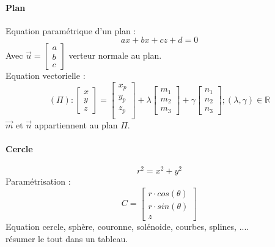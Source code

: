 \paragraph{Plan}
Equation paramétrique d'un plan :
\begin{equation}
ax+bx+cz+d=0
\end{equation}
Avec $\vec{u}=\begin{bmatrix}
a\\ b\\ c
\end{bmatrix}$ verteur normale au plan.\\
Equation vectorielle :
\begin{equation}
(\Pi):
\begin{bmatrix}
x \\
y\\
z
\end{bmatrix}
=
\begin{bmatrix}
x_p\\
y_p\\
z_p\\
\end{bmatrix}
+\lambda
\begin{bmatrix}
m_1\\
m_2 \\
m_3
\end{bmatrix}
+ \gamma
\begin{bmatrix}
n_1\\
n_2 \\
n_3
\end{bmatrix}; (\lambda,\gamma) \in \mathbb{R}
\end{equation}
$\vec{m}$ et $\vec{n}$ appartiennent au plan $\Pi$.
\paragraph{Cercle}

\begin{equation}
r^2=x^2+y^2
\end{equation}
Paramétrisation :
\begin{equation}
C =
\begin{bmatrix}
r \cdot cos(\theta) \\
r \cdot sin(\theta)\\
z
\end{bmatrix}
\end{equation}
Equation cercle, sphère, couronne, solénoide, courbes, splines, ....\\

résumer le tout dans un tableau. 

